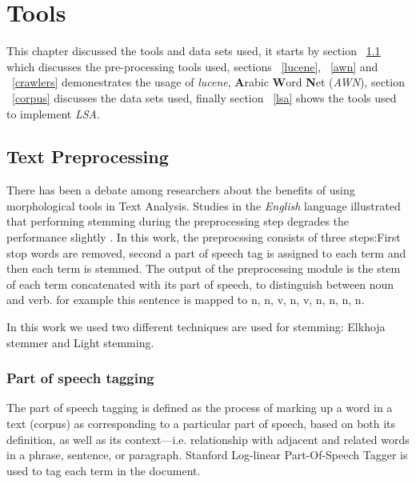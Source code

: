 
\chapter{Tools} %

\label{tools} %


This chapter discussed the tools and data sets used, it starts by section ~\ref{pre} which discusses the pre-processing tools used, sections ~\ref{lucene}, ~\ref{awn} and ~\ref{crawlers} demonestrates the usage of \textit{lucene}, \textbf{A}rabic \textbf{W}ord \textbf{N}et (\textit{AWN}), section ~\ref{corpus} discusses the data sets used, finally section ~\ref{lsa} shows the tools used to implement \textit{LSA}.
\section{Text Preprocessing}\label{pre}
There has been a debate among researchers about the benefits of using morphological tools in Text Analysis. Studies in the \textit{English}
language illustrated that performing stemming during the preprocessing step degrades the performance slightly \citep{pre_8} \citep{pre_9}. 
In this work, the preprocssing consists of three steps:First stop words are removed, second a part of speech tag is assigned to each term and then each term is stemmed.
The output of the preprocessing module is the stem of each term concatenated with its part of speech, to distinguish between noun and verb. for example this sentence  is mapped to n, n, v, n, v, n, n, n, n.

In this work we used two different techniques are used for stemming: Elkhoja stemmer and Light stemming.

\subsection{Part of speech tagging}

The part of speech tagging is defined as  the process of marking up a word in a text (corpus) as corresponding to a particular part of speech, based on both its definition, as well as its context—i.e. relationship with adjacent and related words in a phrase, sentence, or paragraph. 
Stanford Log-linear Part-Of-Speech Tagger \citep{pre_1} \citep{pre_2} is used to tag each term in the document.


